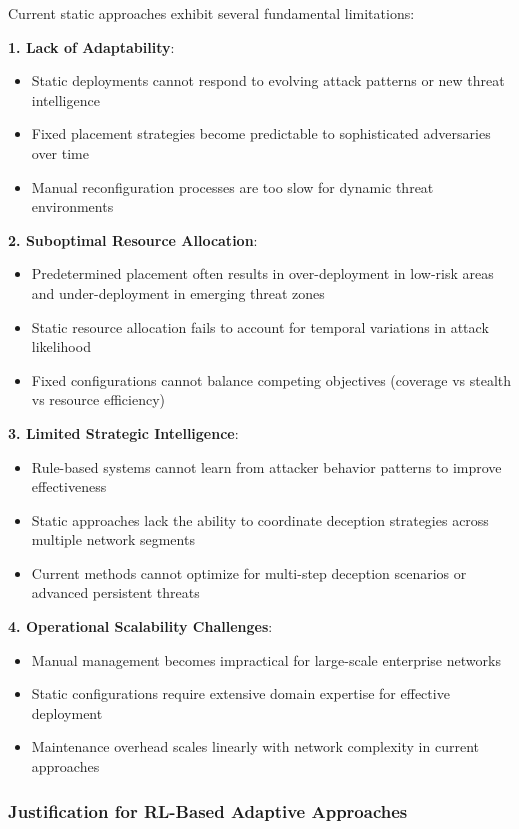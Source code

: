 \documentclass[12pt,oneside]{article}
\begin{document}
Current static approaches exhibit several fundamental limitations:

\textbf{1. Lack of Adaptability}:
\begin{itemize}
\item Static deployments cannot respond to evolving attack patterns or new threat intelligence
\item Fixed placement strategies become predictable to sophisticated adversaries over time
\item Manual reconfiguration processes are too slow for dynamic threat environments
\end{itemize}

\textbf{2. Suboptimal Resource Allocation}:
\begin{itemize}
\item Predetermined placement often results in over-deployment in low-risk areas and under-deployment in emerging threat zones
\item Static resource allocation fails to account for temporal variations in attack likelihood
\item Fixed configurations cannot balance competing objectives (coverage vs stealth vs resource efficiency)
\end{itemize}

\textbf{3. Limited Strategic Intelligence}:
\begin{itemize}
\item Rule-based systems cannot learn from attacker behavior patterns to improve effectiveness
\item Static approaches lack the ability to coordinate deception strategies across multiple network segments
\item Current methods cannot optimize for multi-step deception scenarios or advanced persistent threats
\end{itemize}

\textbf{4. Operational Scalability Challenges}:
\begin{itemize}
\item Manual management becomes impractical for large-scale enterprise networks
\item Static configurations require extensive domain expertise for effective deployment
\item Maintenance overhead scales linearly with network complexity in current approaches
\end{itemize}

\subsubsection{Justification for RL-Based Adaptive Approaches}
\end{document}
